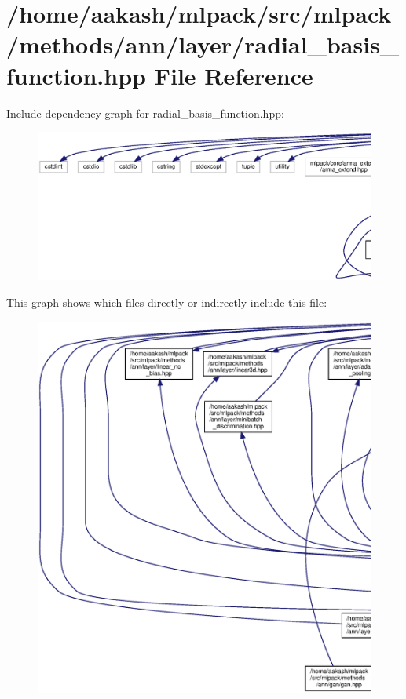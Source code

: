 \section{/home/aakash/mlpack/src/mlpack/methods/ann/layer/radial\+\_\+basis\+\_\+function.hpp File Reference}
\label{radial__basis__function_8hpp}
Include dependency graph for radial\+\_\+basis\+\_\+function.\+hpp\+:
\nopagebreak
\begin{figure}[H]
\begin{center}
\leavevmode
\includegraphics[width=350pt]{radial__basis__function_8hpp__incl}
\end{center}
\end{figure}
This graph shows which files directly or indirectly include this file\+:
\nopagebreak
\begin{figure}[H]
\begin{center}
\leavevmode
\includegraphics[width=350pt]{radial__basis__function_8hpp__dep__incl}
\end{center}
\end{figure}

